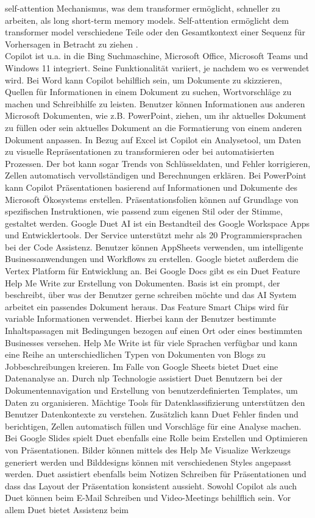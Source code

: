 self-attention Mechanismus, was dem transformer ermöglicht, schneller zu arbeiten, als long short-term memory models. Self-attention ermöglicht dem transformer model verschiedene Teile oder den Gesamtkontext einer Sequenz für Vorhersagen in Betracht zu ziehen \cite{nlp-def}. \\

Copilot ist u.a. in die Bing Suchmaschine, Microsoft Office, Microsoft Teams und Windows 11 integriert. Seine Funktionalität variiert, je nachdem wo es verwendet wird. Bei Word kann Copilot behilflich sein, um Dokumente zu skizzieren, Quellen für Informationen in einem Dokument zu suchen, Wortvorschläge zu machen und Schreibhilfe zu leisten. Benutzer können Informationen aus anderen Microsoft Dokumenten, wie z.B. PowerPoint, ziehen, um ihr aktuelles Dokument zu füllen oder sein aktuelles Dokument an die Formatierung von einem anderen Dokument anpassen. In Bezug auf Excel ist Copilot ein Analysetool, um Daten zu visuelle Repräsentationen zu transformieren oder bei automatisierten Prozessen. Der bot kann sogar Trends von Schlüsseldaten, und Fehler korrigieren, Zellen automatisch vervollständigen und Berechnungen erklären. Bei PowerPoint kann Copilot Präsentationen basierend auf Informationen und Dokumente des Microsoft Ökosystems erstellen. Präsentationsfolien können auf Grundlage von spezifischen Instruktionen, wie passend zum eigenen Stil oder der Stimme, gestaltet werden. Google Duet AI ist ein Bestandteil des Google Workspace Apps und Entwicklertools. Der Service unterstützt mehr als 20 Programmiersprachen bei der Code Assistenz. Benutzer können AppSheets verwenden, um intelligente Businessanwendungen und Workflows zu erstellen. Google bietet außerdem die Vertex Platform für Entwicklung an. Bei Google Docs gibt es ein Duet Feature Help Me Write zur Erstellung von Dokumenten. Basis ist ein prompt, der beschreibt, über was der Benutzer gerne schreiben möchte und das AI System arbeitet ein passendes Dokument heraus. Das Feature Smart Chips wird für variable Informationen verwendet. Hierbei kann der Benutzer bestimmte Inhaltspassagen mit Bedingungen bezogen auf einen Ort oder eines bestimmten Businesses versehen. Help Me Write ist für viele Sprachen verfügbar und kann eine Reihe an unterschiedlichen Typen von Dokumenten von Blogs zu Jobbeschreibungen kreieren. Im Falle von Google Sheets bietet Duet eine Datenanalyse an. Durch \gls{nlp} Technologie assistiert Duet Benutzern bei der Dokumentennavigation und Erstellung von benutzerdefinierten Templates, um Daten zu organisieren. Mächtige Tools für Datenklassifizierung unterstützen den Benutzer Datenkontexte zu verstehen. Zusätzlich kann Duet Fehler finden und berichtigen, Zellen automatisch füllen und Vorschläge für eine Analyse machen. Bei Google Slides spielt Duet ebenfalls eine Rolle beim Erstellen und Optimieren von Präsentationen. Bilder können mittels des Help Me Visualize Werkzeugs generiert werden und Bilddesigns können mit verschiedenen Styles angepasst werden. Duet assistiert ebenfalls beim Notizen Schreiben für Präsentationen und dass das Layout der Präsentation konsistent aussieht. Sowohl Copilot als auch Duet können beim E-Mail Schreiben und Video-Meetings behilflich sein. Vor allem Duet bietet Assistenz beim 
